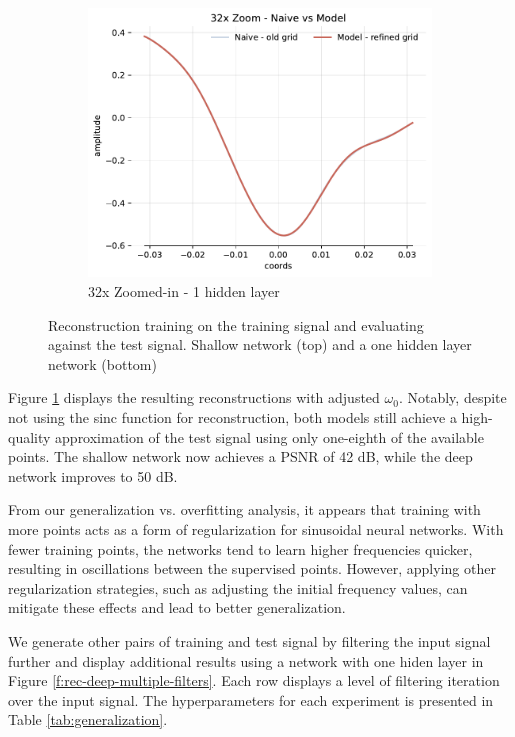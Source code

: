 \begin{figure}[!h]
\begin{subfigure}[b]{0.32\textwidth}
        \centering
        \includegraphics[width=\textwidth]{img/ch3/32x-64hf-1hl-16w-sub3.pdf}
        \caption{32x Zoomed-in - 1 hidden layer}
    \end{subfigure}
    \caption{Reconstruction training on the training signal and evaluating against the test signal. Shallow network (top) and a one hidden layer network (bottom)}
    \label{f:pred-256samples-shallow-deep-adjusted}
\end{figure}


Figure \ref{f:pred-256samples-shallow-deep-adjusted} displays the resulting reconstructions with adjusted \(\omega_0\). Notably, despite not using the sinc function for reconstruction, both models still achieve a high-quality approximation of the test signal using only one-eighth of the available points. The shallow network now achieves a PSNR of 42 dB, while the deep network improves to 50 dB.

From our generalization vs. overfitting analysis, it appears that training with more points acts as a form of regularization for sinusoidal neural networks. With fewer training points, the networks tend to learn higher frequencies quicker, resulting in oscillations between the supervised points. However, applying other regularization strategies, such as adjusting the initial frequency values, can mitigate these effects and lead to better generalization.

We generate other pairs of training and test signal by filtering the input signal further and display additional results using a network with one hiden layer in Figure \ref{f:rec-deep-multiple-filters}. Each row displays a level of filtering iteration over the input signal. The hyperparameters for each experiment is presented in Table \ref{tab:generalization}.


